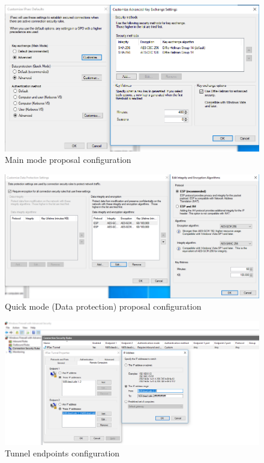 \documentclass[a4paper]{report}
\begin{document}
\begin{figure}[h!]
	\includegraphics[width=\linewidth,keepaspectratio]{IPsec_Defaults_MainMode}
	\caption{Main mode proposal configuration}
\end{figure}

\begin{figure}[h!]
	\includegraphics[width=\linewidth,keepaspectratio]{IPsec_Defaults_DPS_Conf}
	\caption{Quick mode (Data protection) proposal configuration}
\end{figure}

\begin{figure}[h!]
	\includegraphics[width=\linewidth,keepaspectratio]{IPsec_Tunnel_Endpoint_Conf}
	\caption{Tunnel endpoints configuration}
\end{figure}
\end{document}

